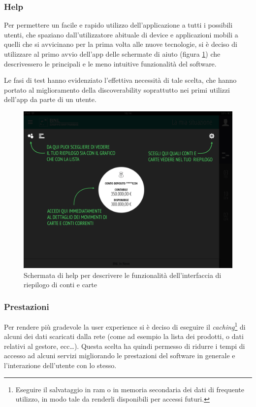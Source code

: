 \subsubsection{Help}
Per permettere un facile e rapido utilizzo dell'applicazione a tutti i possibili utenti, che spaziano dall'utilizzatore abituale di device e applicazioni mobili a quelli che si avvicinano per la prima volta alle nuove tecnologie, si è deciso di utilizzare al primo avvio dell'app delle schermate di aiuto (figura \ref{fig:help}) che descrivessero le principali  e le meno intuitive funzionalità del software.

Le fasi di test hanno evidenziato l'effettiva necessità di tale scelta, che hanno portato al miglioramento della discoverability soprattutto nei primi utilizzi dell'app da parte di un utente.

\begin{figure}[htbp]
\centering
\includegraphics[scale=0.20]{ux/help.jpg}

\caption{Schermata di help per descrivere le funzionalità dell'interfaccia di riepilogo di conti e carte}
\label{fig:help}
\end{figure}


\subsubsection{Prestazioni}
Per rendere più gradevole la user experience si è deciso di eseguire il \emph{caching}\footnote{Eseguire il salvataggio in ram o in memoria secondaria dei dati di frequente utilizzo, in modo tale da renderli disponibili per accessi futuri.} di alcuni dei dati scaricati dalla rete (come ad esempio la lista dei prodotti, o dati relativi al gestore, ecc\dots). Questa scelta ha quindi permesso di ridurre i tempi di accesso ad alcuni servizi migliorando le prestazioni del software in generale e l'interazione dell'utente con lo stesso.  